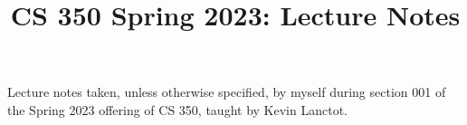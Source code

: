 \documentclass[notes,minted]{agony}
\title{CS 350 Spring 2023: Lecture Notes}
\begin{document}
\renewcommand{\contentsname}{CS 350 Spring 2023:\\{\huge Lecture Notes}}
\thispagestyle{firstpage}
\tableofcontents

Lecture notes taken, unless otherwise specified,
by myself during section 001 of the Spring 2023 offering of CS 350,
taught by Kevin Lanctot.

\begin{multicols*}{2}
  \listoflecture
\end{multicols*}




\printindex
\end{document}
